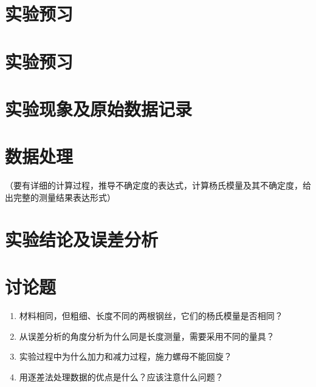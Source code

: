 \documentclass[signature=data]{physicsreport}
\begin{document}
\maketitle

\section{实验预习}
\section{实验预习}

\makeatletter
{}
\makeatother

\newpage

\section{实验现象及原始数据记录}


\makeatletter
{}
\makeatother

\newpage
\section{数据处理}
（要有详细的计算过程，推导不确定度的表达式，计算杨氏模量及其不确定度，给出完整的测量结果表达形式）
\vspace{12em}
\section{实验结论及误差分析}

\section{讨论题}
\begin{enumerate}
    \item 材料相同，但粗细、长度不同的两根钢丝，它们的杨氏模量是否相同？
 

    \item 从误差分析的角度分析为什么同是长度测量，需要采用不同的量具？
    

    \item 实验过程中为什么加力和减力过程，施力螺母不能回旋？
    

    \item 用逐差法处理数据的优点是什么？应该注意什么问题？
\end{enumerate}
\end{document}
